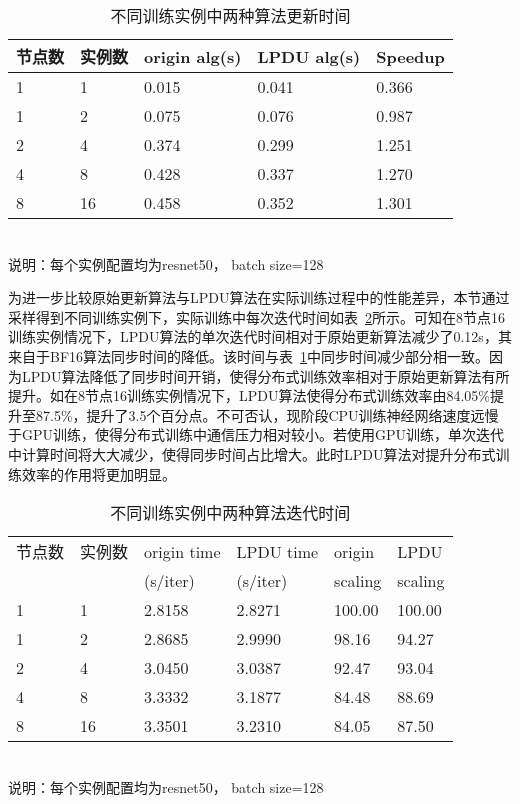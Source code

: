 \begin{table}[htbp]
  \centering
  \caption{不同训练实例中两种算法更新时间}
  \label{tab:fp32_bf16_real_update_time}
  \begin{minipage}[t]{0.8\textwidth} 
    \begin{tabularx}{\linewidth}{|l|X|X|X|X|}
      \hline
      节点数 & 实例数 & origin alg(s) & LPDU alg(s) & Speedup\\
      \hline
1 & 1 & 0.015 & 0.041 & 0.366 \\
1 & 2 & 0.075 & 0.076 & 0.987 \\
2 & 4 & 0.374 & 0.299 & 1.251 \\
4 & 8 & 0.428 & 0.337 & 1.270 \\
8 & 16 & 0.458 & 0.352 & 1.301 \\
      \hline
    \end{tabularx}\\[2pt]
    \footnotesize
    说明：每个实例配置均为resnet50， batch size=128\\
  \end{minipage}
\end{table}

为进一步比较原始更新算法与LPDU算法在实际训练过程中的性能差异，本节通过采样得到不同训练实例下，实际训练中每次迭代时间如表~\ref{tab:fp32_bf16_real_iter_time}所示。可知在8节点16训练实例情况下，LPDU算法的单次迭代时间相对于原始更新算法减少了0.12s，其来自于BF16算法同步时间的降低。该时间与表~\ref{tab:fp32_bf16_real_update_time}中同步时间减少部分相一致。因为LPDU算法降低了同步时间开销，使得分布式训练效率相对于原始更新算法有所提升。如在8节点16训练实例情况下，LPDU算法使得分布式训练效率由84.05\%提升至87.5\%，提升了3.5个百分点。不可否认，现阶段CPU训练神经网络速度远慢于GPU训练，使得分布式训练中通信压力相对较小。若使用GPU训练，单次迭代中计算时间将大大减少，使得同步时间占比增大。此时LPDU算法对提升分布式训练效率的作用将更加明显。

\begin{table}[htbp]
  \centering
  \caption{不同训练实例中两种算法迭代时间}
  \label{tab:fp32_bf16_real_iter_time}
  \begin{minipage}[t]{0.9\textwidth} 
    \begin{tabularx}{\linewidth}{|l|X|X|X|X|X|}
      \hline
      节点数 & 实例数 & origin time & LPDU time & origin & LPDU \\
       &  & (s/iter) & (s/iter) & scaling & scaling\\
      \hline
1 & 1 & 2.8158 & 2.8271 & 100.00 & 100.00 \\
1 & 2 & 2.8685 & 2.9990 & 98.16 & 94.27 \\
2 & 4 & 3.0450 & 3.0387 & 92.47 & 93.04 \\
4 & 8 & 3.3332 & 3.1877 & 84.48 & 88.69 \\
8 & 16 & 3.3501 & 3.2310 & 84.05 & 87.50 \\
      \hline
    \end{tabularx}\\[2pt]
    \footnotesize
    说明：每个实例配置均为resnet50， batch size=128\\
  \end{minipage}
\end{table}

